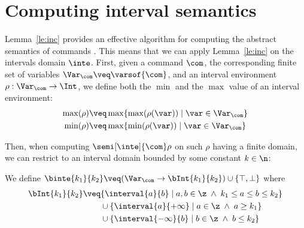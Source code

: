 \section{Computing interval semantics}
\label{sec:computingint}

Lemma~\ref{le:inc} provides an effective algorithm for computing the abstract
semantics of commands%
. This means that we can apply Lemma~\ref{le:inc} on the intervals
domain \(\inte\).  First, given a command \(\com\), the corresponding
finite set of variables \(\Var_{\com} \veq \varsof{\com}\), and an
interval environment \(\rho : \Var_{\com} \to \Int\), we define both
the \(\min\) and the \(\max\) value of an interval environment:
\begin{align*}
\max(\rho) & \veq \max \{ \max(\rho(\var)) \mid \var \in \Var_{\com}\} \\
\min(\rho) & \veq \max \{ \min(\rho(\var)) \mid \var \in \Var_{\com}\}
\end{align*}

% 
Then, when computing \(\semi[\inte]{\com} \rho\) on such \(\rho\)
having a finite domain, we can restrict to an interval domain bounded
by some constant \(k\in\n\):

\begin{definition}\label{def:boundedint}
  We define
  \(\binte{k_1}{k_2} \veq (\Var_{\com} \to \bInt{k_1}{k_2}) \cup
  \{\top, \bot\}\) where
  \begin{align*}
    \bInt{k_1}{k_2} & \veq \{ \interval{a}{b} \mid a, b \in \z \; \land \; k_1 \leq a \leq b \leq k_2\} \\
                    & \phantom{\veq} \cup \{\interval{a}{+\infty} \mid a \in \z \; \land \; a \geq k_1\} \\
                    & \phantom{\veq} \cup \{\interval{-\infty}{b} \mid b \in \z \; \land \; b \leq k_2\}
  \end{align*}
\end{definition}

